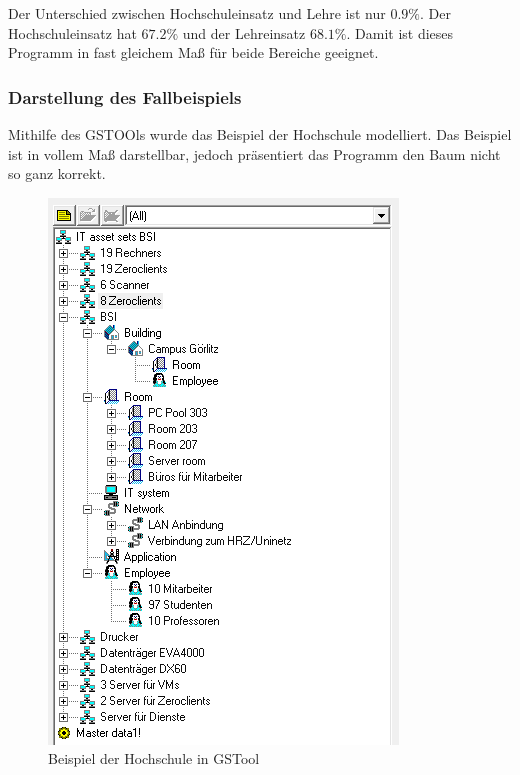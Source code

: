 Der Unterschied zwischen Hochschuleinsatz und Lehre ist nur $0.9\%$. Der Hochschuleinsatz hat $67.2\%$ und der Lehreinsatz $68.1\%$. Damit ist dieses Programm in fast gleichem Maß für beide Bereiche geeignet.

\subsubsection{Darstellung des Fallbeispiels}

Mithilfe des GSTOOls wurde das Beispiel der Hochschule modelliert. Das Beispiel ist in vollem Maß darstellbar, jedoch präsentiert das Programm den Baum nicht so ganz korrekt.  

\begin{figure}[htbp]
	\includegraphics[scale=0.5]{images/gstooltree}
	\caption{Beispiel der Hochschule in GSTool}
	\label{fig:GSTooltree}
\end{figure}  


